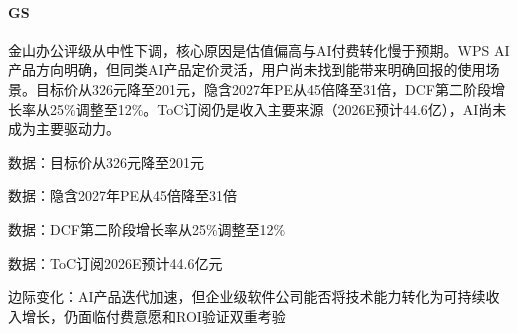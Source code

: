 \documentclass[11pt]{ctexart}
\begin{document}
\paragraph{GS} 金山办公评级从中性下调，核心原因是估值偏高与AI付费转化慢于预期。WPS AI产品方向明确，但同类AI产品定价灵活，用户尚未找到能带来明确回报的使用场景。目标价从326元降至201元，隐含2027年PE从45倍降至31倍，DCF第二阶段增长率从25\%调整至12\%。ToC订阅仍是收入主要来源（2026E预计44.6亿），AI尚未成为主要驱动力。
{\small\color{refgray}数据：目标价从326元降至201元\par}
{\small\color{refgray}数据：隐含2027年PE从45倍降至31倍\par}
{\small\color{refgray}数据：DCF第二阶段增长率从25\%调整至12\%\par}
{\small\color{refgray}数据：ToC订阅2026E预计44.6亿元\par}
{\small\color{refgray}边际变化：AI产品迭代加速，但企业级软件公司能否将技术能力转化为可持续收入增长，仍面临付费意愿和ROI验证双重考验\par}
\end{document}

